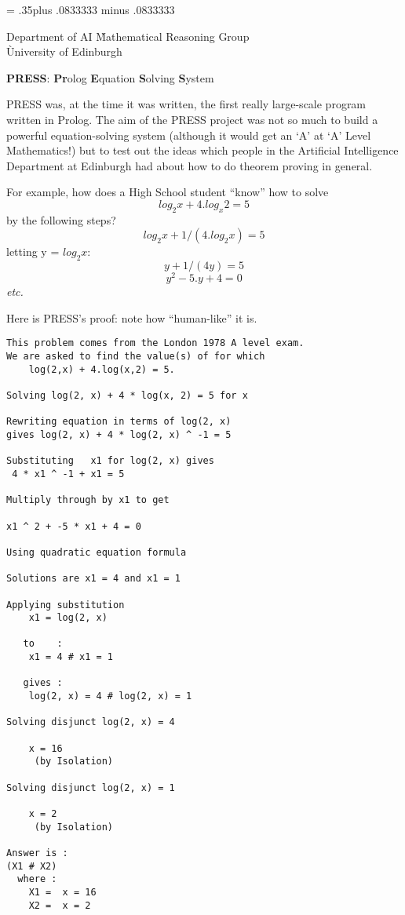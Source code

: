 \def\id#1{\hbox{\it#1}}
\parindent=0pt
\parskip= .35\baselineskip plus .0833333\baselineskip 
                          minus .0833333\baselineskip


\begin{tabbing}
Department of AI \` Mathematical Reasoning Group \\
\` University of Edinburgh \\
\end{tabbing}
\begin{center}
\begin{LARGE}
{\bf PRESS}: {\bf Pr}olog {\bf E}quation {\bf S}olving {\bf S}ystem
\end{LARGE}
\end{center}


PRESS was, at the time it was written, the first really large-scale
program written in Prolog. The aim of the PRESS project was not so much
to build a powerful equation-solving system (although it would get
an `A' at `A' Level Mathematics!) but to test out the ideas which
people in the Artificial Intelligence Department at Edinburgh had
about how to do theorem proving in general.

For example, how does a High School student ``know'' how to solve
\[ 	log_2 x + 4.log_x 2 = 5 \]
by the following steps?
\[ log_2 x + 1/(4.log_2 x) = 5 \]
letting y = $log_2 x$:
\[ y + 1/(4y)  = 5 \]
\[ y^2  - 5.y + 4 = 0 \]
{\em etc.}

Here is PRESS's proof: note how ``human-like'' it is.

\begin{footnotesize}

\begin{verbatim}
This problem comes from the London 1978 A level exam.
We are asked to find the value(s) of for which
	log(2,x) + 4.log(x,2) = 5.

Solving log(2, x) + 4 * log(x, 2) = 5 for x

Rewriting equation in terms of log(2, x)
gives log(2, x) + 4 * log(2, x) ^ -1 = 5

Substituting   x1 for log(2, x) gives
 4 * x1 ^ -1 + x1 = 5

Multiply through by x1 to get 

x1 ^ 2 + -5 * x1 + 4 = 0

Using quadratic equation formula

Solutions are x1 = 4 and x1 = 1

Applying substitution 
    x1 = log(2, x)

   to    : 
    x1 = 4 # x1 = 1

   gives : 
    log(2, x) = 4 # log(2, x) = 1

Solving disjunct log(2, x) = 4

    x = 16
     (by Isolation)

Solving disjunct log(2, x) = 1

    x = 2
     (by Isolation)

Answer is : 
(X1 # X2)
  where :
    X1 =  x = 16
    X2 =  x = 2

\end{verbatim}

\end{footnotesize}





